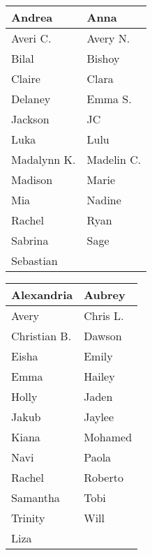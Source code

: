 \documentclass{article}
\date{}
\newcommand{\tabrowEnd}{\rule{0pt}{41pt}\\}
\begin{document}
  \centering
  \noindent
  {\LARGE
    \begin{tabular}{| p{} | p{} |}
      \hline
      Andrea               & Anna \tabrowEnd
      \hline
      Averi C.             & Avery N. \tabrowEnd
      \hline
      Bilal                & Bishoy \tabrowEnd
      \hline
      Claire               & Clara \tabrowEnd
      \hline
      Delaney              & Emma S. \tabrowEnd
      \hline
      Jackson              & JC \tabrowEnd
      \hline
      Luka                 & Lulu \tabrowEnd
      \hline
      Madalynn K.          & Madelin C. \tabrowEnd
      \hline
      Madison              & Marie \tabrowEnd
      \hline
      Mia                  & Nadine \tabrowEnd
      \hline
      Rachel               & Ryan \tabrowEnd
      \hline
      Sabrina              & Sage \tabrowEnd
      \hline
      Sebastian            & \tabrowEnd
      \hline
    \end{tabular}
  }
  {\LARGE
    \begin{tabular}{| p{} | p{} |}
      \hline
      Alexandria           & Aubrey \tabrowEnd
      \hline
      Avery                & Chris L. \tabrowEnd
      \hline
      Christian B.         & Dawson \tabrowEnd
      \hline
      Eisha                & Emily \tabrowEnd
      \hline
      Emma                 & Hailey \tabrowEnd
      \hline
      Holly                & Jaden \tabrowEnd
      \hline
      Jakub                & Jaylee \tabrowEnd
      \hline
      Kiana                & Mohamed \tabrowEnd
      \hline
      Navi                 & Paola \tabrowEnd
      \hline
      Rachel               & Roberto \tabrowEnd
      \hline
      Samantha             & Tobi \tabrowEnd
      \hline
      Trinity              & Will \tabrowEnd
      \hline
      Liza                 & \tabrowEnd
      \hline
    \end{tabular}
  }
\end{document}
